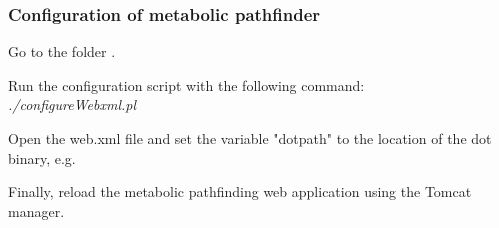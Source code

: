 \documentclass{book}
\begin{document}
\subsubsection{Configuration of metabolic pathfinder}
Go to the folder
.

Run the configuration script with the following command:\\
\textit{./configureWebxml.pl}

Open the web.xml file and set the variable "dotpath" to the location
of the dot binary, e.g. 

Finally, reload the metabolic pathfinding web application using the Tomcat manager.
\end{document}
